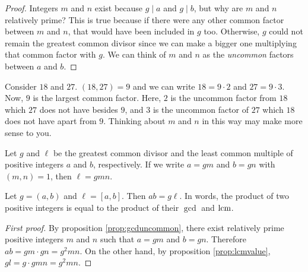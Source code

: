 \documentclass{subfile}
\begin{document}
	\begin{proof}
		Integers $m$ and $n$ exist because $g\mid a$ and $g\mid b$, but why are $m$ and $n$ relatively prime? This is true because if there were any other common factor between $m$ and $n$, that would have been included in $g$ too. Otherwise, $g$ could not remain the greatest common divisor since we can make a bigger one multiplying that common factor with $g$. We can think of $m$ and $n$ as the \textit{uncommon} factors between $a$ and $b$.
	\end{proof}

	\begin{example}
		Consider $18$ and $27$. $(18,27)=9$ and we can write $18=9\cdot2$ and $27=9\cdot3$. Now, $9$ is the largest common factor. Here, $2$ is the uncommon factor from $18$ which $27$ does not have besides $9$, and $3$ is the uncommon factor of $27$ which $18$ does not have apart from $9$. Thinking about $m$ and $n$ in this way may make more sense to you.
	\end{example}

	\begin{proposition}\label{prop:lcmvalue}
		Let $g$ and $\ell$ be the greatest common divisor and the least common multiple of positive integers $a$ and $b$, respectively. If we write $a=gm$ and $b=gn$ with $(m,n)=1$, then $\ell=gmn$.
	\end{proposition}

	\begin{proposition}
		Let $g=(a,b)$ and $\ell = [a,b]$. Then $ab=g\ell$. In words, the product of two positive integers is equal to the product of their $\gcd$ and $\operatorname{lcm}$.
	\end{proposition}


	\begin{proof}[First proof]
		By proposition \eqref{prop:gcduncommon}, there exist relatively prime positive integers $m$ and $n$ such that $a=gm$ and $b=gn$. Therefore $ab=gm\cdot gn=g^2mn$. On the other hand, by proposition \eqref{prop:lcmvalue}, $gl=g\cdot gmn=g^2mn$.
	\end{proof}
\end{document}
